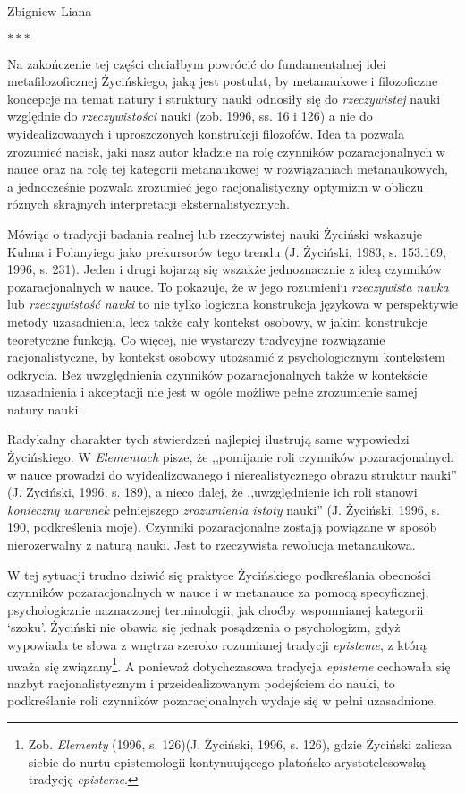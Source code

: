 \begin{artplenv}{Zbigniew Liana}
\medskip
{\centering$\ast\ast\ast$\par}
\smallskip


Na zakończenie tej części chciałbym powrócić do fundamentalnej idei metafilozoficznej Życińskiego, jaką jest postulat,
by metanaukowe i filozoficzne koncepcje na temat natury i struktury nauki odnosiły się do \textit{rzeczywistej} nauki
względnie do \textit{rzeczywistości} nauki (zob. 1996, ss. 16 i 126) a nie do wyidealizowanych i uproszczonych
konstrukcji filozofów. Idea ta pozwala zrozumieć nacisk, jaki nasz autor kładzie na rolę czynników pozaracjonalnych w nauce
oraz na rolę tej kategorii metanaukowej w rozwiązaniach metanaukowych, a jednocześnie pozwala zrozumieć jego
racjonalistyczny optymizm w obliczu różnych skrajnych interpretacji eksternalistycznych.

Mówiąc o tradycji badania realnej lub rzeczywistej nauki Życiński wskazuje Kuhna i Polanyiego jako prekursorów tego
trendu \label{ref:RNDi6TPvuVUK4}(J. Życiński, 1983, s. 153.169, 1996, s. 231). Jeden i drugi kojarzą się wszakże
jednoznacznie z ideą czynników pozaracjonalnych w nauce. To pokazuje, że w jego rozumieniu \textit{rzeczywista nauka} lub
\textit{rzeczywistość nauki} to nie tylko logiczna konstrukcja językowa w perspektywie metody uzasadnienia, lecz także
cały kontekst osobowy, w jakim konstrukcje teoretyczne funkcją. Co więcej, nie wystarczy tradycyjne rozwiązanie
racjonalistyczne, by kontekst osobowy utożsamić z psychologicznym kontekstem odkrycia. Bez uwzględnienia czynników
pozaracjonalnych także w kontekście uzasadnienia i akceptacji nie jest w ogóle możliwe pełne zrozumienie samej natury
nauki.

Radykalny charakter tych stwierdzeń najlepiej ilustrują same wypowiedzi Życińskiego. W \textit{Elementach} pisze, że
,,pomijanie roli czynników pozaracjonalnych w nauce prowadzi do wyidealizowanego i nierealistycznego obrazu struktur
nauki'' \label{ref:RND07iSFRLobf}(J. Życiński, 1996, s. 189), a nieco dalej, że ,,uwzględnienie ich roli stanowi
\textit{konieczny warunek} pełniejszego \textit{zrozumienia istoty} nauki'' \label{ref:RNDVV3U1jSC9D}(J. Życiński, 1996,
s. 190, podkreślenia moje).  Czynniki pozaracjonalne zostają powiązane w sposób nierozerwalny z naturą nauki. Jest to
rzeczywista rewolucja metanaukowa.

W tej sytuacji trudno dziwić się praktyce Życińskiego podkreślania obecności czynników pozaracjonalnych w nauce i w metanauce
za pomocą specyficznej, psychologicznie naznaczonej terminologii, jak choćby wspomnianej kategorii `szoku'.
Życiński nie obawia się jednak posądzenia o psychologizm, gdyż wypowiada te słowa z wnętrza szeroko rozumianej tradycji
\textit{episteme}, z którą uważa się związany\footnote{Zob. \textit{Elementy} (1996, s. 126)\label{ref:RNDxQIHHr1tkz}(J.
Życiński, 1996, s. 126), gdzie Życiński zalicza siebie do nurtu epistemologii kontynuującego platońsko-arystotelesowską
tradycję \textit{episteme}.}. A ponieważ dotychczasowa tradycja \textit{episteme} cechowała się nazbyt racjonalistycznym i przeidealizowanym
podejściem do nauki, to podkreślanie roli czynników pozaracjonalnych wydaje się w pełni uzasadnione.


\end{artplenv}
